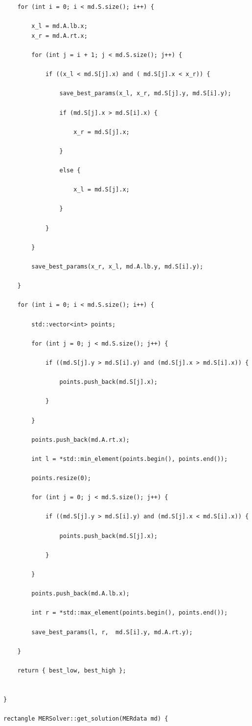 \documentclass[a4paper,12pt]{article}
\begin{document}
{{{\begin{lstlisting}
	for (int i = 0; i < md.S.size(); i++) {

		x_l = md.A.lb.x;
		x_r = md.A.rt.x;
		
		for (int j = i + 1; j < md.S.size(); j++) {

			if ((x_l < md.S[j].x) and ( md.S[j].x < x_r)) {

				save_best_params(x_l, x_r, md.S[j].y, md.S[i].y);

				if (md.S[j].x > md.S[i].x) {

					x_r = md.S[j].x;

				}

				else {

					x_l = md.S[j].x;

				}

			}

		}

		save_best_params(x_r, x_l, md.A.lb.y, md.S[i].y);

	}

	for (int i = 0; i < md.S.size(); i++) {

		std::vector<int> points;

		for (int j = 0; j < md.S.size(); j++) {

			if ((md.S[j].y > md.S[i].y) and (md.S[j].x > md.S[i].x)) {

				points.push_back(md.S[j].x);

			}

		}

		points.push_back(md.A.rt.x); 

		int l = *std::min_element(points.begin(), points.end());

		points.resize(0);

		for (int j = 0; j < md.S.size(); j++) {

			if ((md.S[j].y > md.S[i].y) and (md.S[j].x < md.S[i].x)) {

				points.push_back(md.S[j].x);

			}

		}

		points.push_back(md.A.lb.x); 

		int r = *std::max_element(points.begin(), points.end());

		save_best_params(l, r,  md.S[i].y, md.A.rt.y);

	}

	return { best_low, best_high };


}
	
rectangle MERSolver::get_solution(MERdata md) {


\end{lstlisting}}}}
\end{document}
